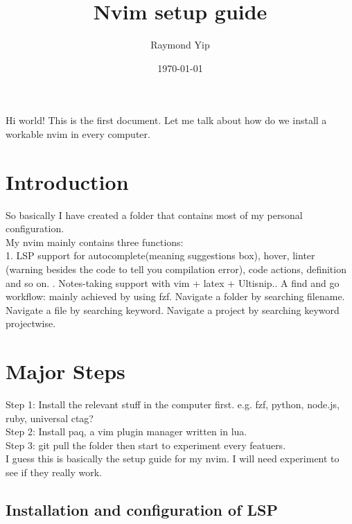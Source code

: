 \documentclass{article}
\title{Nvim setup guide}
\author{Raymond Yip}
\date{\today}
\begin{document}
\maketitle

Hi world! This is the first document. Let me talk about how do we install a workable nvim in every computer. 

\section{Introduction}

So basically I have created a  folder that contains most of my personal configuration.\newline\\
%
My nvim mainly contains three functions:\newline\\
%
1. LSP support for autocomplete(meaning suggestions box), hover, linter (warning besides the code to tell you compilation error), code actions, definition and so on. . Notes-taking support with vim + latex + Ultisnip.. A find and go workflow: mainly achieved by using fzf. Navigate a folder by searching filename. Navigate a file by searching keyword. Navigate a project by searching keyword projectwise.

\section{Major Steps}

Step 1: Install the relevant stuff in the computer first. e.g. fzf, python, node.js, ruby, universal ctag?\newline\\
Step 2: Install paq, a vim plugin manager written in lua. \newline\\ 
Step 3: git pull the  folder then start to experiment every featuers. \newline\\
I guess this is basically the setup guide for my nvim. I will need experiment to see if they really work.

\subsection{Installation and configuration of LSP}
\end{document}
